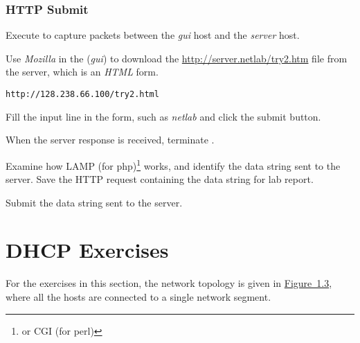 \documentclass{../UTNetLab}
\begin{document}
\section{HTTP Submit}
Execute  to capture packets between the \textit{gui} host and the \textit{server} host.

Use \textit{Mozilla}  in the (\textit{gui}) to download the \url{http://server.netlab/try2.htm} file  from the server, which is an \textit{HTML} form.

\begin{lstlisting}
http://128.238.66.100/try2.html
\end{lstlisting}


Fill the input line in the form, such as \textit{netlab} and click the submit button.

When the server response is received, terminate .

Examine how LAMP (for php)\footnote{or CGI (for perl)} works, and identify the data string sent to the server.
Save the HTTP request containing the data string for lab report.

\begin{report}
    \item Submit the data string sent to the server.
\end{report}

\part{DHCP Exercises}
For the exercises in this section, the network topology is given in \hyperref[fig:1.3]{Figure~1.3}, where all the hosts are connected to a single network segment.
\end{document}
